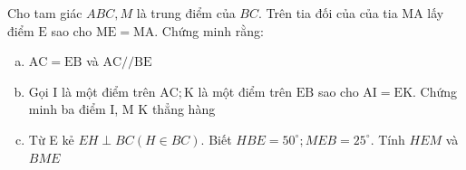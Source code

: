 \begin{bt}
	Cho tam giác $A B C, M$ là trung điểm của $B C$. Trên tia đối của của tia MA lấy điểm $\mathrm{E}$ sao cho $\mathrm{ME}=\mathrm{MA}$. Chứng minh rằng:
	\begin{enumerate}[a.]
		\item $\mathrm{AC}=\mathrm{EB}$ và $\mathrm{AC} / / \mathrm{BE}$
        \item Gọi I là một điểm trên $\mathrm{AC} ; \mathrm{K}$ là một điểm trên $\mathrm{EB}$ sao cho $\mathrm{AI}=\mathrm{EK}$. Chứng minh ba điểm I, M $\mathrm{K}$ thẳng hàng
        \item Từ E kẻ $E H \perp B C(H \in B C)$. Biết $H B E=50^{\circ} ; M E B=25^{\circ}$. Tính $H E M$ và $B M E$
    \end{enumerate}
\end{bt}

